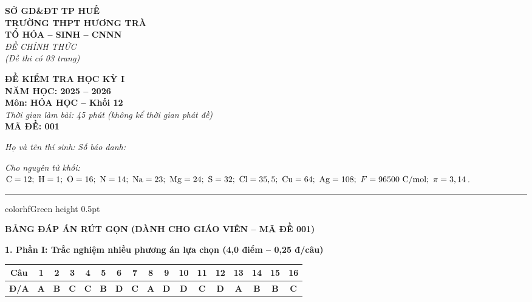 \documentclass[11pt,a4paper]{article}
\begin{document}
\begin{minipage}[t]{0.48\textwidth}
\textbf{SỞ GD\&ĐT TP HUẾ}\\
\textbf{TRƯỜNG THPT HƯƠNG TRÀ}\\
\textbf{TỔ HÓA -- SINH -- CNNN}\\
\textit{ĐỀ CHÍNH THỨC}\\
\textit{(Đề thi có 03 trang)}
\end{minipage}
\hfill
\begin{minipage}[t]{0.48\textwidth}
\raggedleft
\textbf{\color{hfRed}ĐỀ KIỂM TRA HỌC KỲ I}\\
\textbf{NĂM HỌC: 2025 -- 2026}\\
\textbf{Môn: HÓA HỌC -- Khối 12}\\
\textit{Thời gian làm bài: 45 phút (không kể thời gian phát đề)}\\
\textbf{MÃ ĐỀ: 001}
\end{minipage}

\vspace{4pt}
\noindent
\textit{Họ và tên thí sinh:} \dotfill \textit{Số báo danh:} \dotfill

\vspace{3pt}
\noindent
\textit{\footnotesize Cho nguyên tử khối: $\ce{C}=12;\ \ce{H}=1;\ \ce{O}=16;\ \ce{N}=14;\ \ce{Na}=23;\ \ce{Mg}=24;\ \ce{S}=32;\ \ce{Cl}=35,5;\ \ce{Cu}=64;\ \ce{Ag}=108;\ F = 96500\text{ C/mol};\ \pi = 3,14$.}

\vspace{3pt}
\hrule color{hfGreen} height 0.5pt

\vspace{6pt}
\begin{center}
{\Large\textbf{\color{hfRed}BẢNG ĐÁP ÁN RÚT GỌN (DÀNH CHO GIÁO VIÊN -- MÃ ĐỀ 001)}}
\end{center}

\vspace{2pt}
\noindent
\textbf{\color{mainGreen}1. Phần I: Trắc nghiệm nhiều phương án lựa chọn (4,0 điểm -- 0,25 đ/câu)}
\begin{center}
\renewcommand{\arraystretch}{1.2}
\setlength{\tabcolsep}{3.5pt}
\begin{tabular}{|c|c|c|c|c|c|c|c|c|c|c|c|c|c|c|c|c|}
\hline
\rowcolor{tableGreen}
\textbf{Câu} & \textbf{1} & \textbf{2} & \textbf{3} & \textbf{4} & \textbf{5} & \textbf{6} & \textbf{7} & \textbf{8} & \textbf{9} & \textbf{10} & \textbf{11} & \textbf{12} & \textbf{13} & \textbf{14} & \textbf{15} & \textbf{16} \\
\hline
\textbf{Đ/A} & \textbf{\color{hfRed}A} & \textbf{\color{hfRed}B} & \textbf{\color{hfRed}C} & \textbf{\color{hfRed}C} & \textbf{\color{hfRed}B} & \textbf{\color{hfRed}D} & \textbf{\color{hfRed}C} & \textbf{\color{hfRed}A} & \textbf{\color{hfRed}D} & \textbf{\color{hfRed}D} & \textbf{\color{hfRed}C} & \textbf{\color{hfRed}D} & \textbf{\color{hfRed}A} & \textbf{\color{hfRed}B} & \textbf{\color{hfRed}B} & \textbf{\color{hfRed}C} \\
\hline
\end{tabular}
\end{center}
\end{document}
